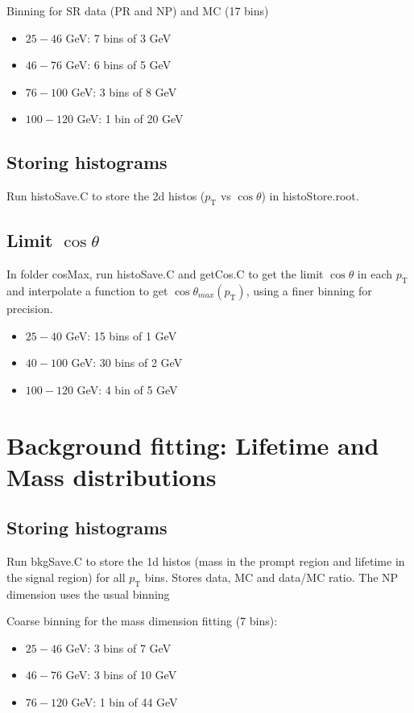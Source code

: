 \documentclass{article}
\newcommand{\pt}{p_\text{T}}
\newcommand{\cost}{\cos\theta}
\begin{document}
Binning for SR data (PR and NP) and MC (17 bins)
\begin{itemize}
\item $25-46$ GeV: 7 bins of 3 GeV
\item $46-76$ GeV: 6 bins of 5 GeV
\item $76-100$ GeV: 3 bins of 8 GeV
\item $100-120$ GeV: 1 bin of 20 GeV
\end{itemize}

\subsection{Storing histograms}

Run histoSave.C to store the 2d histos ($\pt$ vs $\cost$) in histoStore.root.

\subsection{Limit $\cost$}

In folder cosMax, run histoSave.C and getCos.C to get the limit $\cost$ in each $\pt$ and interpolate a function to get $\cost_{max}(\pt)$, using a finer binning for precision.
\begin{itemize}
\item $25-40$ GeV: 15 bins of 1 GeV
\item $40-100$ GeV: 30 bins of 2 GeV
\item $100-120$ GeV: 4 bin of 5 GeV
\end{itemize}

\pagebreak

\section{Background fitting: Lifetime and Mass distributions}

\subsection{Storing histograms}

Run bkgSave.C to store the 1d histos (mass in the prompt region and lifetime in the signal region) for all $\pt$ bins. Stores data, MC and data/MC ratio. The NP dimension uses the usual binning

Coarse binning for the mass dimension fitting (7 bins):
\begin{itemize}
\item $25-46$ GeV: 3 bins of 7 GeV
\item $46-76$ GeV: 3 bins of 10 GeV
\item $76-120$ GeV: 1 bin of 44 GeV
\end{itemize}
\end{document}
